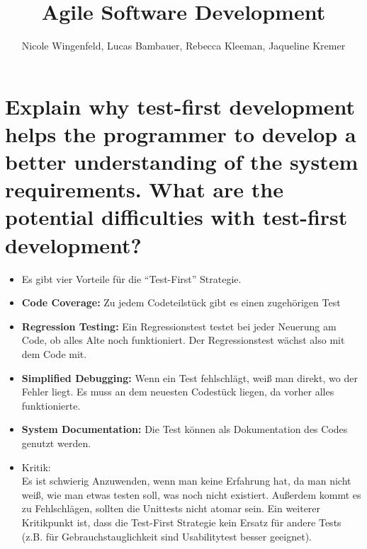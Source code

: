 \documentclass[a4paper,10pt]{article}
\title{Agile Software Development}
\author{Nicole Wingenfeld, Lucas Bambauer, Rebecca Kleeman, Jaqueline Kremer}
\begin{document}
\maketitle



\section*{Explain why test-first development helps the programmer to develop a better understanding of the system requirements. What are the potential difficulties with test-first development?}
\begin{itemize}
 \item[] Es gibt vier Vorteile für die ``Test-First'' Strategie. 
 \item [] \textbf{Code Coverage:} Zu jedem Codeteilstück gibt es einen zugehörigen Test
 \item[]\textbf{Regression Testing:}  Ein Regressionstest testet bei jeder Neuerung am Code, ob alles Alte noch funktioniert. Der Regressionstest wächst also mit dem Code mit. 
 \item[] \textbf{Simplified Debugging:} Wenn ein Test fehlschlägt, weiß man direkt, wo der Fehler liegt. Es muss an dem neuesten Codestück liegen, da vorher alles funktionierte. 
 \item[] \textbf{System Documentation:} Die Test können als Dokumentation des Codes genutzt werden. 
 \item[]Kritik: \\ Es ist schwierig Anzuwenden, wenn man keine Erfahrung hat, da man nicht weiß, wie man etwas testen soll, was noch nicht existiert. Außerdem kommt es zu Fehlschlägen, sollten die Unittests nicht atomar sein. Ein weiterer Kritikpunkt ist, dass die Test-First Strategie kein Ersatz für andere Tests (z.B. für Gebrauchstauglichkeit sind Usabilitytest besser geeignet).
\end{itemize}
\end{document}
